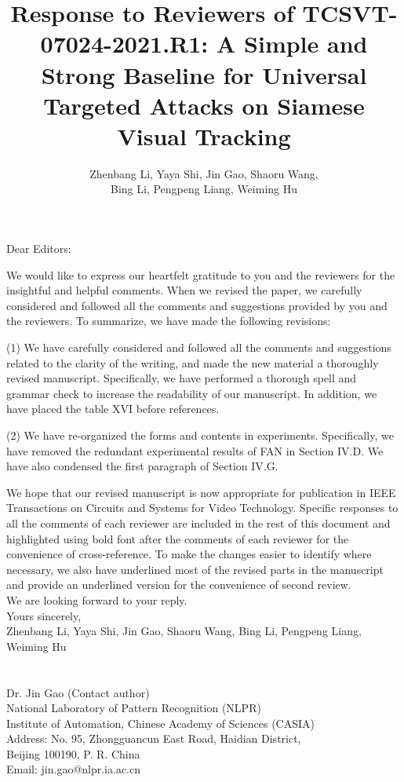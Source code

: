 \documentclass[12pt]{article}
\begin{document}
\linespread{1}
\title{Response to Reviewers of TCSVT-07024-2021.R1: A Simple and Strong Baseline for Universal Targeted Attacks on Siamese Visual Tracking}
\author{Zhenbang Li, Yaya Shi, Jin Gao, Shaoru Wang, \\Bing Li, Pengpeng Liang, Weiming Hu}
\date{}
\maketitle

\noindent Dear Editors:

We would like to express our heartfelt gratitude to you and the reviewers for the insightful and helpful comments. When we revised the paper, we carefully considered and followed all the comments and suggestions provided by you and the reviewers. To summarize, we have made the following revisions:

(1) We have carefully considered and followed all the comments and suggestions related to the clarity of the writing, and made the new material a thoroughly revised manuscript. Specifically, we have performed a thorough spell and grammar check to increase the readability of our manuscript. In addition, we have placed the table XVI before references.

(2) We have re-organized the forms and contents in experiments. Specifically, we have removed the redundant experimental results of FAN in Section IV.D. We have also condensed the first paragraph of Section IV.G.

We hope that our revised manuscript is now appropriate for publication in IEEE Transactions on Circuits and Systems for Video Technology. Specific responses to all the comments of each reviewer are included in the rest of this document and highlighted using bold font after the comments of each reviewer for the convenience of cross-reference. To make the changes easier to identify where necessary, we also have underlined most of the revised parts in the manuscript and provide an underlined version for the convenience of second review.\\[10pt]
\indent We are looking forward to your reply.\\[10pt]
\noindent Yours sincerely,\\
\noindent Zhenbang Li, Yaya Shi, Jin Gao, Shaoru Wang, Bing Li, Pengpeng Liang, Weiming Hu
\\
\\
\\
\noindent Dr. Jin Gao (Contact author)\\
\noindent National Laboratory of Pattern Recognition (NLPR)\\
\noindent Institute of Automation, Chinese Academy of Sciences (CASIA)\\
\noindent Address: No. 95, Zhongguancun East Road, Haidian District,\\
\noindent Beijing 100190, P. R. China\\
\noindent Email: jin.gao@nlpr.ia.ac.cn
\end{document}
